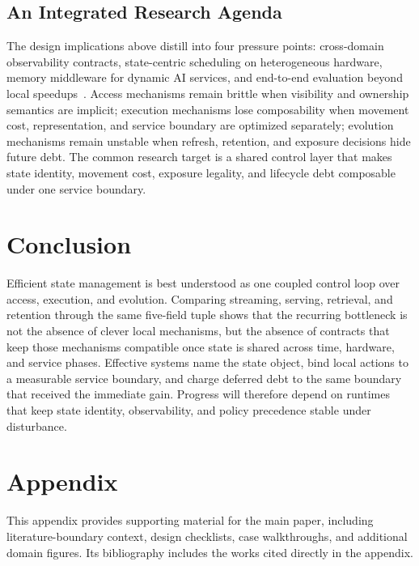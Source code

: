 \documentclass[manuscript,nonacm]{acmart}
\begin{document}
\subsection{An Integrated Research Agenda}

The design implications above distill into four pressure points: cross-domain observability contracts, state-centric scheduling on heterogeneous hardware, memory middleware for dynamic AI services, and end-to-end evaluation beyond local speedups~\cite{zhang2019briskstream,zhang2020finestream,kwon2023pagedattention,sheng2023flexgen,cong2026mico,zhang2026neuromem,liu2026sage}. Access mechanisms remain brittle when visibility and ownership semantics are implicit; execution mechanisms lose composability when movement cost, representation, and service boundary are optimized separately; evolution mechanisms remain unstable when refresh, retention, and exposure decisions hide future debt. The common research target is a shared control layer that makes state identity, movement cost, exposure legality, and lifecycle debt composable under one service boundary.

\section{Conclusion}
\label{sec:conclusion}

Efficient state management is best understood as one coupled control loop over access, execution, and evolution. Comparing streaming, serving, retrieval, and retention through the same five-field tuple shows that the recurring bottleneck is not the absence of clever local mechanisms, but the absence of contracts that keep those mechanisms compatible once state is shared across time, hardware, and service phases. Effective systems name the state object, bind local actions to a measurable service boundary, and charge deferred debt to the same boundary that received the immediate gain. Progress will therefore depend on runtimes that keep state identity, observability, and policy precedence stable under disturbance.

\clearpage

\appendix
\makeatletter
\gdef\shorttitle{Appendix}
\gdef\shortauthors{}
\makeatother
\section*{Appendix}

This appendix provides supporting material for the main paper, including literature-boundary context, design checklists, case walkthroughs, and additional domain figures. Its bibliography includes the works cited directly in the appendix.








\end{document}
